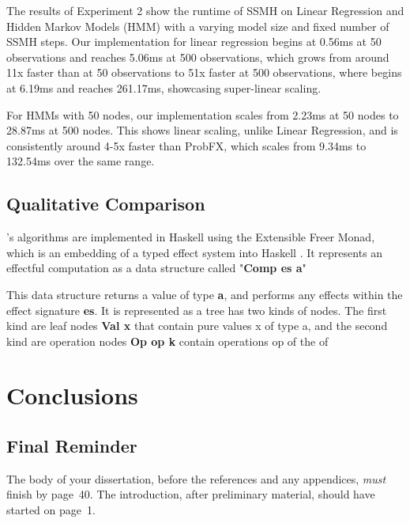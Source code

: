 \documentclass[logo,bsc,singlespacing,parskip,online]{infthesis}
\begin{document}
The results of Experiment 2 show the runtime of SSMH on Linear Regression and Hidden Markov Models (HMM) with a varying model size and fixed number of SSMH steps. Our implementation for linear regression begins at 0.56ms at 50 observations and reaches 5.06ms at 500 observations, which grows from around 11x faster than \cite{ProbFX} at 50 observations to 51x faster at 500 observations, where \cite{ProbFX} begins at 6.19ms and reaches 261.17ms, showcasing super-linear scaling.


For HMMs with 50 nodes, our implementation scales from 2.23ms at 50 nodes to 28.87ms at 500 nodes. This shows linear scaling, unlike Linear Regression, and is consistently around 4-5x faster than ProbFX, which scales from 9.34ms to 132.54ms over the same range. 


\section{Qualitative Comparison}

\cite{ProbFX}'s algorithms are implemented in Haskell using the Extensible Freer Monad, which is an embedding of a typed effect system into Haskell \citep{extensiblefreermonad}. It represents an effectful computation as a data structure called "\textbf{Comp es a}"

This data structure returns a value of type \textbf{a}, and performs any effects within the effect signature \textbf{es}. It is represented as a tree has two kinds of nodes. The first kind are leaf nodes \textbf{Val x} that contain pure values x of type a, and the second kind are operation nodes \textbf{Op op k}
contain operations op of the of 




















\chapter{Conclusions}

\section{Final Reminder}

The body of your dissertation, before the references and any appendices,
\emph{must} finish by page~40. The introduction, after preliminary material,
should have started on page~1.
\end{document}
